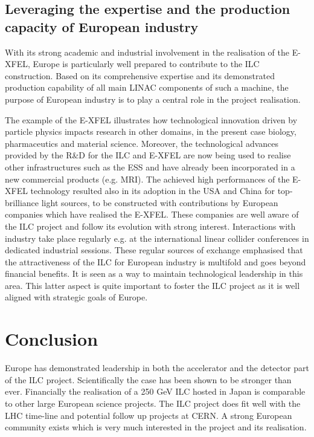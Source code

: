 \documentclass[%
 reprint,
 floatfix,
 amsmath,amssymb,
 aps,
]{revtex4-1}
\begin{document}
\subsection{\label{sec:discussionInd}Leveraging the expertise and the production capacity of European industry}

With its strong academic and industrial involvement in the realisation of the E-XFEL, Europe is
particularly well prepared to contribute to the ILC construction. Based on its comprehensive expertise
and its demonstrated production capability of all main LINAC components of such a machine, the purpose of European industry is to play a central role in the project realisation. 

The example of the E-XFEL illustrates how technological innovation driven by particle physics impacts
research in other domains, in the present case biology, pharmaceutics and material science. Moreover, 
the technological advances provided by the R\&D for the ILC and E-XFEL are now being used to realise
other infrastructures such as the ESS and have already been incorporated in a new commercial products (e.g. MRI). The achieved high performances of the E-XFEL
technology resulted also in its adoption in the USA and China for top-brilliance light sources, to be
constructed with contributions by European companies which have realised the E-XFEL.
These companies are well aware of the ILC project and follow its evolution with strong interest. Interactions with industry take place regularly
e.g. at the international linear collider conferences in dedicated industrial sessions.
 These regular sources of exchange emphasised that the attractiveness of the ILC
for European industry is multifold and goes beyond financial benefits. It is seen as a way to maintain technological leadership in this area. This latter aspect is quite
important to foster the ILC project as it is well aligned with strategic goals of Europe.

\section{Conclusion}
Europe has demonstrated leadership in both the accelerator and the detector part of the ILC project. 
Scientifically the case has been shown to be stronger than ever. Financially the realisation of a 250 GeV ILC hosted in Japan is comparable to other large European science projects. The ILC project does fit well with the LHC time-line and potential follow up projects at CERN. A strong European community exists which is very much interested in the project and its realisation. 



\end{document}
